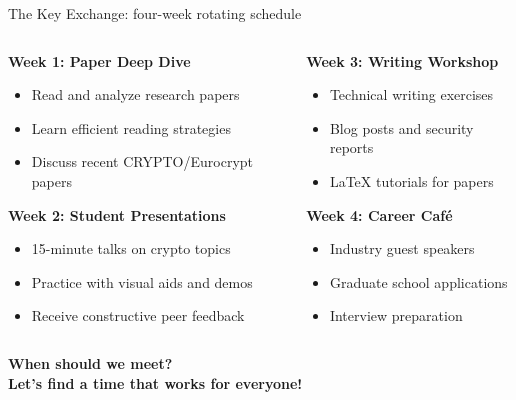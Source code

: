 \documentclass[aspectratio=169, lualatex, handout]{beamer}
\begin{document}
\begin{frame}{The Key Exchange: four-week rotating schedule}
	\begin{columns}[c]
		\begin{column}{0.5\textwidth}
			\textbf{Week 1: Paper Deep Dive}
			\begin{itemize}
				\item Read and analyze research papers
				\item Learn efficient reading strategies
				\item Discuss recent CRYPTO/Eurocrypt papers
			\end{itemize}
			\vspace{0.3cm}
			\textbf{Week 2: Student Presentations}
			\begin{itemize}
				\item 15-minute talks on crypto topics
				\item Practice with visual aids and demos
				\item Receive constructive peer feedback
			\end{itemize}
		\end{column}
		\begin{column}{0.5\textwidth}
			\textbf{Week 3: Writing Workshop}
			\begin{itemize}
				\item Technical writing exercises
				\item Blog posts and security reports
				\item LaTeX tutorials for papers
			\end{itemize}
			\vspace{0.3cm}
			\textbf{Week 4: Career Café}
			\begin{itemize}
				\item Industry guest speakers
				\item Graduate school applications
				\item Interview preparation
			\end{itemize}
		\end{column}
	\end{columns}
	\vspace{0.1cm}
	\begin{center}
		\Large\textcolor{cipherprimary}{\textbf{When should we meet? \\ Let's find a time that works for everyone!}}
	\end{center}
\end{frame}

\begin{frame}[plain]
	\titlepage
\end{frame}
\end{document}

